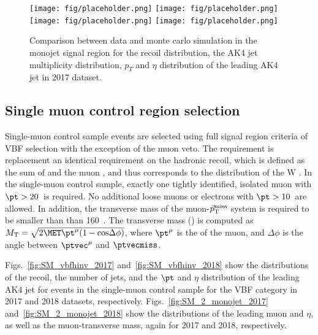 {\begin{figure}[htbp]
    \begin{center}
        \texttt{[image: fig/placeholder.png]}
        \texttt{[image: fig/placeholder.png]} \\
        \texttt{[image: fig/placeholder.png]}
        \texttt{[image: fig/placeholder.png]}
    \end{center}
    \caption{Comparison between data and monte carlo simulation in the monojet signal region for
        the recoil distribution, the AK4 jet multiplicity distribution,  $p_T$ and $\eta$
        distribution of the leading AK4  jet in 2017 dataset.}
    \label{fig:SR_pre_monoV_2018}
\end{figure}

\newpage

\subsection{Single muon control region selection}
\label{sec:selection_cr_1m}

Single-muon control sample events are selected using full signal region criteria of VBF selection with the exception of the muon veto. 
The \ptmiss requirement is replacement an identical requirement on the hadronic recoil, which is defined as the sum of \ptvecmiss and the muon \vpt, 
and thus corresponds to the distribution of the W \pt.
In the single-muon control sample, exactly one tightly identified, isolated muon with $\pt > 20$~\GeV is required. 
No additional loose muons or electrons with $\pt > 10$~\GeV are allowed.
In addition, the transverse mass of the muon-$\vec p_{\rm T}^{\rm miss}$ system is required to be smaller than than 160~\GeV.
The transverse mass (\mt) is computed as $\mt = \sqrt{2\MET \pt^{\mu} (1 - \mathrm{cos}\Delta\phi)}$, 
where $\pt^{\mu}$ is the \pt of the muon, and $\Delta\phi$ is the angle between $\ptvec^{\mu}$ and $\ptvecmiss$.


Figs.~\ref{fig:SM_vbfhinv_2017} and~\ref{fig:SM_vbfhinv_2018} show the distributions of the recoil, 
the number of jets, and the $\pt$ and $\eta$ distribution of the leading AK4 jet
for events in the single-muon control sample for the VBF category in 2017 and 2018 datasets, respectively. 
Figs.~\ref{fig:SM_2_monojet_2017} and~\ref{fig:SM_2_monojet_2018} show the distributions of the leading muon \pt and $\eta$, 
as well as the muon-\ptmiss transverse mass, again for 2017 and 2018, respectively.


}
